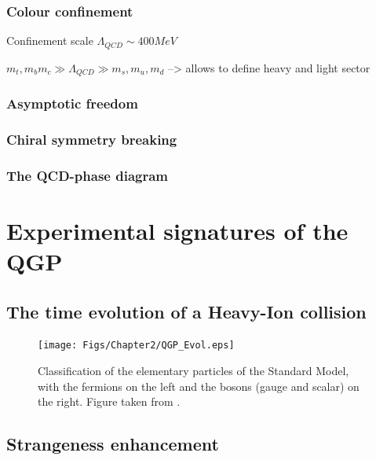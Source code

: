 \subsubsection{Colour confinement}
\label{subsubsec:confinement}


Confinement scale $\Lambda_{QCD} \sim 400 MeV$

$m_{t}, m_{b} m_{c} \gg \Lambda_{QCD} \gg m_{s}, m_{u}, m_{d}$
--> allows to define heavy and light sector

\subsubsection{Asymptotic freedom}
\label{subsubsec:asymptotic freedom}

\cite{grossUltravioletBehaviorNonAbelian1973} \cite{davidpolitzerAsymptoticFreedomApproach1974}

\subsubsection{Chiral symmetry breaking}
\label{subsubsec:chiralsymmetrybreaking}

\subsubsection{The QCD-phase diagram}
\label{subsubsec:QCDphasediagram}

\section{Experimental signatures of the QGP}

\subsection{The time evolution of a Heavy-Ion collision}

\begin{figure}[h]
	\centering
	\texttt{[image: Figs/Chapter2/QGP\_Evol.eps]}
	\caption{Classification of the elementary particles of the Standard Model, with the fermions on the left and the bosons (gauge and scalar) on the right. Figure taken from \cite{missmjStandardModelElementary2019}.}
	\label{fig:QGPEvol}
\end{figure}

\subsection{Strangeness enhancement}

